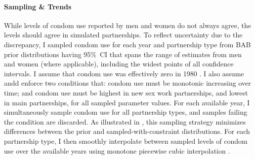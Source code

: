 \paragraph{Sampling \& Trends}
While levels of condom use reported by men and women do not always agree,
the levels should agree in simulated partnerships.
To reflect uncertainty due to the discrepancy,
I sampled condom use for each year and partnership type
from BAB prior distributions having 95\%~CI
that spans the range of estimates from men and women (where applicable),
including the widest points of all confidence intervals.
I assume that condom use was effectively zero in 1980 \cite{SFHS1988}.
I also assume andd enforce two conditions that:
condom use must be monotonic increasing over time; and
condom use must be highest in new sex work partnerships, and lowest in main partnerships,
for all sampled parameter values.
For each available year, I simultaneously sample condom use for all partnership types,
and samples failing the condition are discarded.
As illustrated in , this sampling strategy
minimizes differences between the prior and sampled-with-constraint distributions.
For each partnership type, I then smoothly interpolate
between sampled levels of condom use over the available years
using monotone piecewise cubic interpolation \cite{Fritsch1980}.
